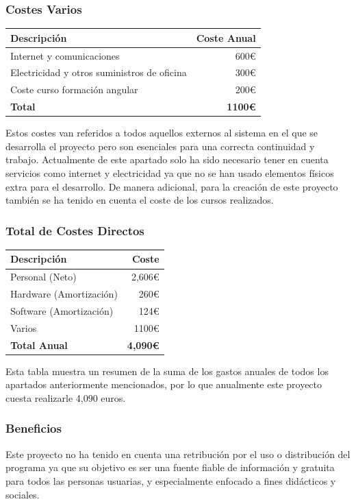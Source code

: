 \subsubsection*{Costes Varios}

\begin{tabular}{lr}
\toprule
Descripción & Coste Anual \\
\midrule
Internet y comunicaciones & 600€ \\
Electricidad y otros suministros de oficina & 300€ \\
 Coste curso formación angular&200€\\
\textbf{Total} & \textbf{1100€}\\
\bottomrule
\end{tabular}

Estos costes van referidos a todos aquellos externos al sistema en el que se desarrolla el proyecto pero son esenciales para una correcta continuidad y trabajo. 
Actualmente de este apartado solo ha sido necesario tener en cuenta servicios como internet y electricidad ya que no se han usado elementos físicos extra para el desarrollo.
De manera adicional, para la creación de este proyecto también se ha tenido en cuenta el coste de los cursos realizados.
\subsubsection*{Total de Costes Directos}

\begin{tabular}{lr}
\toprule
Descripción & Coste \\
\midrule
Personal (Neto) & 2,606€ \\
Hardware (Amortización) & 260€ \\
Software (Amortización) & 124€\\
Varios & 1100€\\
\textbf{Total Anual} & \textbf{4,090€}\\
\bottomrule
\end{tabular}

Esta tabla muestra un resumen de la suma de los gastos anuales de todos los apartados anteriormente mencionados, por lo que anualmente este proyecto cuesta realizarle 4,090 euros.

\subsubsection{Beneficios}
Este proyecto no ha tenido en cuenta una retribución por el uso o distribución del programa ya que su objetivo es ser una fuente fiable de información y gratuita para todos las personas usuarias, y especialmente enfocado a fines didácticos y sociales.
